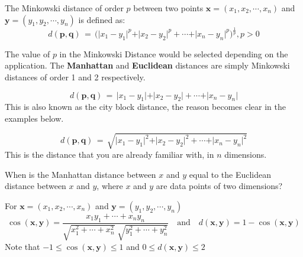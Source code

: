 \documentclass[11pt,fleqn]{book} %
\begin{document}
\begin{definition}
The Minkowski distance of order $p$ between two points $\mathbf{x} = (x_1, x_2, \cdots, x_n)$ and $\mathbf{y} = (y_1, y_2, \cdots, y_n)$ is defined as:
\begin{equation*}
	d(\mathbf{p},\mathbf{q}) \, = \, \Bigg(\vert x_1 - y_1 \vert^p + \vert x_2 - y_2 \vert^p + \cdots + \vert x_n - y_n \vert^p \Bigg)^{\frac{1}{p}}, p > 0
\end{equation*}
\end{definition}

\noindent
The value of $p$ in the Minkowski Distance would be selected depending on the application. The \textbf{Manhattan} and \textbf{Euclidean} distances are simply Minkowski distances of order 1 and 2 respectively.\\

\begin{definition}
\begin{equation*}
	d(\mathbf{p},\mathbf{q}) \, = \, \vert x_1 - y_1 \vert + \vert x_2 - y_2 \vert + \cdots + \vert x_n - y_n \vert
\end{equation*}
This is also known as the city block distance, the reason becomes clear in the examples below.
\end{definition}

\begin{definition}
\begin{equation*}
	d(\mathbf{p},\mathbf{q}) \, = \, \sqrt{\vert x_1 - y_1 \vert^2 + \vert x_2 - y_2 \vert^2 + \cdots + \vert x_n - y_n \vert^2}
\end{equation*}
This is the distance that you are already familiar with, in $n$ dimensions.
\end{definition}

\begin{exercise}
When is the Manhattan distance between $x$ and $y$ equal to the Euclidean distance between $x$ and $y$, where $x$ and $y$ are data points of two dimensions?
\end{exercise}

\begin{definition}
For $\mathbf{x} = (x_1, x_2, \cdots, x_n)$ and $\mathbf{y} = (y_1, y_2, \cdots, y_n)$
\begin{equation*}
	\cos(\mathbf{x}, \mathbf{y}) = \frac{x_1y_1 + \cdots + x_ny_n}{\sqrt{x_1^2 + \cdots + x_n^2} \; \sqrt{y_1^2 + \cdots + y_n^2}} \quad \text{and} \quad d(\mathbf{x}, \mathbf{y}) = 1 - \cos(\mathbf{x}, \mathbf{y})
\end{equation*}
Note that $-1 \leq \cos(\mathbf{x}, \mathbf{y}) \leq 1$ and $0 \leq d(\mathbf{x}, \mathbf{y}) \leq 2$
\end{definition}
\end{document}
